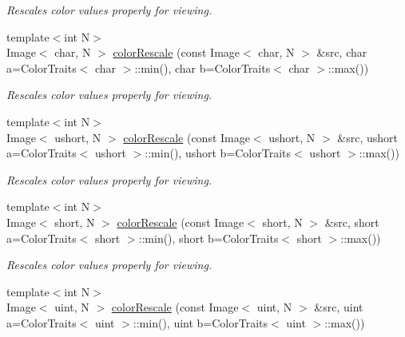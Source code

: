 \begin{DoxyCompactItemize}
\begin{DoxyCompactList}\small\item\em Rescales color values properly for viewing. \end{DoxyCompactList}\item 
\hypertarget{group___image_gade813affccdcbf8455a9ff56245a33f7}{{\footnotesize template$<$int N$>$ }\\Image$<$ char, N $>$ \hyperlink{group___image_gade813affccdcbf8455a9ff56245a33f7}{color\-Rescale} (const Image$<$ char, N $>$ \&src, char a=Color\-Traits$<$ char $>$\-::min(), char b=Color\-Traits$<$ char $>$\-::max())}\label{group___image_gade813affccdcbf8455a9ff56245a33f7}

\begin{DoxyCompactList}\small\item\em Rescales color values properly for viewing. \end{DoxyCompactList}\item 
\hypertarget{group___image_gadcb06b3bb92c3caebf9fe27518bfef40}{{\footnotesize template$<$int N$>$ }\\Image$<$ ushort, N $>$ \hyperlink{group___image_gadcb06b3bb92c3caebf9fe27518bfef40}{color\-Rescale} (const Image$<$ ushort, N $>$ \&src, ushort a=Color\-Traits$<$ ushort $>$\-::min(), ushort b=Color\-Traits$<$ ushort $>$\-::max())}\label{group___image_gadcb06b3bb92c3caebf9fe27518bfef40}

\begin{DoxyCompactList}\small\item\em Rescales color values properly for viewing. \end{DoxyCompactList}\item 
\hypertarget{group___image_gad1637ce411303db7d9633a8227bdcdaa}{{\footnotesize template$<$int N$>$ }\\Image$<$ short, N $>$ \hyperlink{group___image_gad1637ce411303db7d9633a8227bdcdaa}{color\-Rescale} (const Image$<$ short, N $>$ \&src, short a=Color\-Traits$<$ short $>$\-::min(), short b=Color\-Traits$<$ short $>$\-::max())}\label{group___image_gad1637ce411303db7d9633a8227bdcdaa}

\begin{DoxyCompactList}\small\item\em Rescales color values properly for viewing. \end{DoxyCompactList}\item 
\hypertarget{group___image_ga465663977e6c21ceb263a6cb6289ed59}{{\footnotesize template$<$int N$>$ }\\Image$<$ uint, N $>$ \hyperlink{group___image_ga465663977e6c21ceb263a6cb6289ed59}{color\-Rescale} (const Image$<$ uint, N $>$ \&src, uint a=Color\-Traits$<$ uint $>$\-::min(), uint b=Color\-Traits$<$ uint $>$\-::max())}\label{group___image_ga465663977e6c21ceb263a6cb6289ed59}


\end{DoxyCompactItemize}
